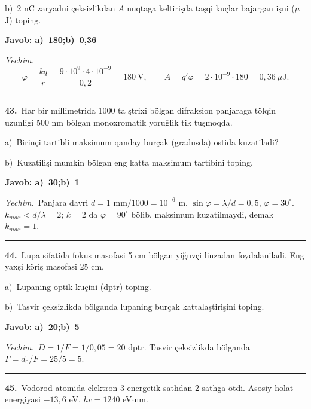 \documentclass[11pt,a4paper]{article}
\begin{document}
\noindent\hspace*{4mm}b)\ 2 nC zaryadni çeksizlikdan $A$ nuqtaga keltirişda taşqi kuçlar bajargan işni ($\mu$J) toping.\par
\noindent\colorbox{gray!12}{\parbox{\dimexpr\linewidth-2\fboxsep}{\textbf{Javob: a)\ 180;\quad b)\ 0,36}}}\par\smallskip
\noindent\textit{Yechim.}\ \[\varphi=\frac{kq}{r}=\frac{9\cdot10^9\cdot4\cdot10^{-9}}{0{,}2}=180\ \text{V},\qquad A=q'\varphi=2\cdot10^{-9}\cdot180=0{,}36\ \mu\text{J}.\]\par\medskip\hrule\medskip
{}\noindent\textbf{43.}\ Har bir millimetrida 1000 ta ştrixi bölgan difraksion panjaraga tölqin uzunligi 500 nm bölgan monoxromatik yoruğlik tik tuşmoqda.\par
\noindent\hspace*{4mm}a)\ Birinçi tartibli maksimum qanday burçak (gradusda) ostida kuzatiladi?\par
\noindent\hspace*{4mm}b)\ Kuzatilişi mumkin bölgan eng katta maksimum tartibini toping.\par
\noindent\colorbox{gray!12}{\parbox{\dimexpr\linewidth-2\fboxsep}{\textbf{Javob: a)\ 30;\quad b)\ 1}}}\par\smallskip
\noindent\textit{Yechim.}\ Panjara davri $d=1$ mm$/1000=10^{-6}$ m. $\sin\varphi=\lambda/d=0{,}5$, $\varphi=30^\circ$. $k_{max}<d/\lambda=2$; $k=2$ da $\varphi=90^\circ$ bölib, maksimum kuzatilmaydi, demak $k_{max}=1$.\par\par\medskip\hrule\medskip
{}\noindent\textbf{44.}\ Lupa sifatida fokus masofasi 5 cm bölgan yiğuvçi linzadan foydalaniladi. Eng yaxşi köriş masofasi 25 cm.\par
\noindent\hspace*{4mm}a)\ Lupaning optik kuçini (dptr) toping.\par
\noindent\hspace*{4mm}b)\ Tasvir çeksizlikda bölganda lupaning burçak kattalaştirişini toping.\par
\noindent\colorbox{gray!12}{\parbox{\dimexpr\linewidth-2\fboxsep}{\textbf{Javob: a)\ 20;\quad b)\ 5}}}\par\smallskip
\noindent\textit{Yechim.}\ $D=1/F=1/0{,}05=20$ dptr. Tasvir çeksizlikda bölganda $\Gamma=d_0/F=25/5=5$.\par\par\medskip\hrule\medskip
{}\noindent\textbf{45.}\ Vodorod atomida elektron 3-energetik sathdan 2-sathga ötdi. Asosiy holat energiyasi $-13{,}6$ eV, $hc=1240$ eV$\cdot$nm.\par
\end{document}
